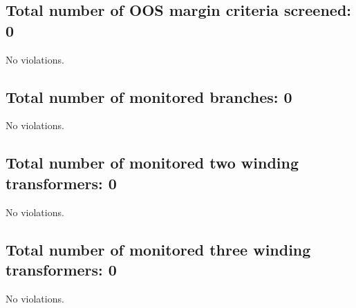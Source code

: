 \documentclass{article}%
\begin{document}
%
\subsection*{Total number of OOS margin criteria screened: 0}%
\label{subsec:TotalnumberofOOSmargincriteriascreened0}%
No violations.

%
\subsection*{Total number of monitored branches: 0}%
\label{subsec:Totalnumberofmonitoredbranches0}%
No violations.

%
\subsection*{Total number of monitored two winding transformers: 0}%
\label{subsec:Totalnumberofmonitoredtwowindingtransformers0}%
No violations.

%
\subsection*{Total number of monitored three winding transformers: 0}%
\label{subsec:Totalnumberofmonitoredthreewindingtransformers0}%
No violations.

%
\end{document}
